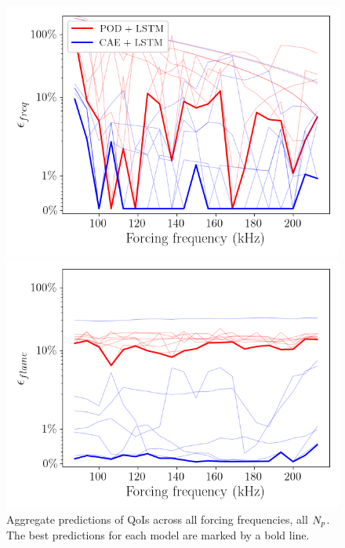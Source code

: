 \begin{figure}
    \begin{minipage}{0.49\linewidth}
        \includegraphics[width=0.99\linewidth]{Chapters/TransientFlame/Images/lstm/freq_err.png}
    \end{minipage}
    \begin{minipage}{0.49\linewidth}
        \includegraphics[width=0.99\linewidth]{Chapters/TransientFlame/Images/lstm/err_flame.png}
    \end{minipage}
    \caption{Aggregate predictions of QoIs across all forcing frequencies, all $N_p$. The best predictions for each model are marked by a bold line.}
\end{figure}